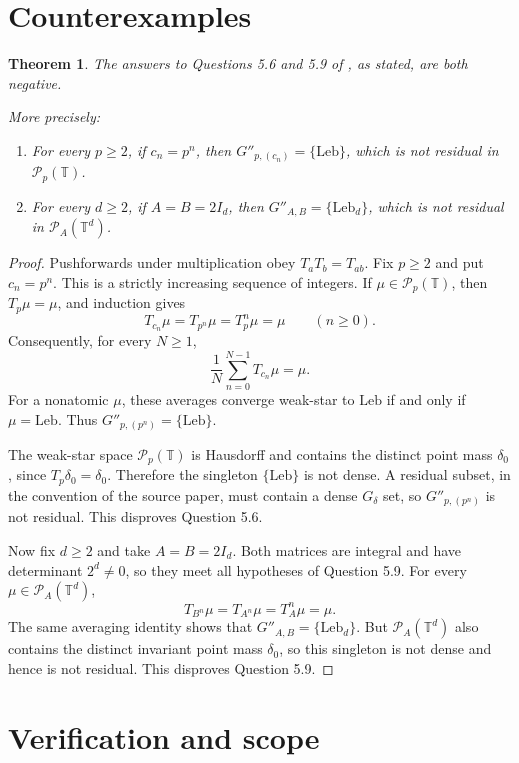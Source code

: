 \documentclass[11pt]{article}
\newtheorem{theorem}{Theorem}
\newcommand{\Torus}{\mathbb T}
\newcommand{\Prob}{\mathcal P}
\newcommand{\Leb}{\mathrm{Leb}}
\begin{document}
\section{Counterexamples}

\begin{theorem}\label{thm:main}
The answers to Questions 5.6 and 5.9 of \cite{BadeaGrivaux}, as stated, are
both negative.

More precisely:
\begin{enumerate}
\item For every $p\geq2$, if $c_n=p^n$, then
      $G''_{p,(c_n)}=\{\Leb\}$, which is not residual in
      $\Prob_p(\Torus)$.
\item For every $d\geq2$, if $A=B=2I_d$, then
      $G''_{A,B}=\{\Leb_d\}$, which is not residual in
      $\Prob_A(\Torus^d)$.
\end{enumerate}
\end{theorem}

\begin{proof}
Pushforwards under multiplication obey $T_aT_b=T_{ab}$. Fix $p\geq2$
and put $c_n=p^n$. This is a strictly increasing sequence of integers.
If $\mu\in\Prob_p(\Torus)$, then $T_p\mu=\mu$, and induction gives
\[
 T_{c_n}\mu=T_{p^n}\mu=T_p^n\mu=\mu
 \qquad(n\geq0).
\]
Consequently, for every $N\geq1$,
\[
 \frac1N\sum_{n=0}^{N-1}T_{c_n}\mu=\mu.
\]
For a nonatomic $\mu$, these averages converge weak-star to $\Leb$ if
and only if $\mu=\Leb$. Thus
$G''_{p,(p^n)}=\{\Leb\}$.

The weak-star space $\Prob_p(\Torus)$ is Hausdorff and contains the
distinct point mass $\delta_0$, since $T_p\delta_0=\delta_0$.
Therefore the singleton $\{\Leb\}$ is not dense. A residual subset, in
the convention of the source paper, must contain a dense $G_\delta$ set,
so $G''_{p,(p^n)}$ is not residual. This disproves Question 5.6.

Now fix $d\geq2$ and take $A=B=2I_d$. Both matrices are integral and
have determinant $2^d\neq0$, so they meet all hypotheses of Question 5.9.
For every $\mu\in\Prob_A(\Torus^d)$,
\[
 T_{B^n}\mu=T_{A^n}\mu=T_A^n\mu=\mu.
\]
The same averaging identity shows that
$G''_{A,B}=\{\Leb_d\}$. But $\Prob_A(\Torus^d)$ also contains the
distinct invariant point mass $\delta_0$, so this singleton is not dense
and hence is not residual. This disproves Question 5.9.
\end{proof}

\section{Verification and scope}
\end{document}
